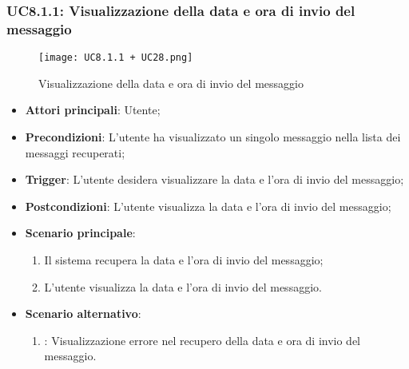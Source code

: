 \hypertarget{UC8.1.1}{}
\subsubsection{UC8.1.1: Visualizzazione della data e ora di invio del messaggio}

\begin{figure}[h]
    \centering
    \texttt{[image: UC8.1.1 + UC28.png]}
    \caption{Visualizzazione della data e ora di invio del messaggio}
\end{figure}

\begin{itemize}
    \item \textbf{Attori principali}: Utente;
    \item \textbf{Precondizioni}: L'utente ha visualizzato un singolo messaggio nella lista dei messaggi recuperati;
    \item \textbf{Trigger}: L'utente desidera visualizzare la data e l'ora di invio del messaggio;
    \item \textbf{Postcondizioni}: L'utente visualizza la data e l'ora di invio del messaggio;
    \item \textbf{Scenario principale}:
    \begin{enumerate}
        \item Il sistema recupera la data e l'ora di invio del messaggio;
        \item L'utente visualizza la data e l'ora di invio del messaggio.
    \end{enumerate}
    \item \textbf{Scenario alternativo}:
    \begin{enumerate}
        \item {}: Visualizzazione errore nel recupero della data e ora di invio del messaggio.
    \end{enumerate}
\end{itemize}

\hypertarget{UC28}{}
